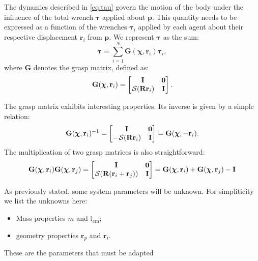 The dynamics described in \eqref{eq:tau} govern the motion of the body under the influence of the total wrench $\boldsymbol{\tau}$ applied about $\mathbf{p}$. This quantity needs to be expressed as a function of the wrenches $\boldsymbol{\tau}_i$ applied by each agent about their respective displacement $\mathbf{r}_i$ from $\mathbf{p}$. We represent $\boldsymbol{\tau}$ as the sum:
\begin{equation}
    \boldsymbol{\tau} = \sum_{i=1}^N\mathbf{G}(\boldsymbol{\chi}, \mathbf{r}_i)\boldsymbol{\tau}_i, \label{eq:tauNtauIrelation}
\end{equation}
where $\mathbf{G}$ denotes the grasp matrix, defined as:
\begin{equation}
    \mathbf{G}(\boldsymbol{\chi}, \mathbf{r}_i) = \begin{bmatrix}
        \mathbf{I} & \mathbf{0} \\
        \SL[\mathbf{R}\mathbf{r}_i] & \mathbf{I}
    \end{bmatrix}. \label{eq:graspmatrix}
\end{equation}

The grasp matrix exhibits interesting properties. Its inverse is given by a simple relation:
\begin{align}
    \mathbf{G}(\boldsymbol{\chi}, \mathbf{r}_i)^{-1} = \begin{bmatrix}
        \mathbf{I} & \mathbf{0} \\
        -\SL[\mathbf{R}\mathbf{r}_i] & \mathbf{I}
    \end{bmatrix} = \mathbf{G}(\boldsymbol{\chi}, -\mathbf{r}_i).
\end{align}
The multiplication of two grasp matrices is also straightforward:
\begin{align}
    \mathbf{G}(\boldsymbol{\chi}, \mathbf{r}_i)\mathbf{G}(\boldsymbol{\chi}, \mathbf{r}_j) =
    \begin{bmatrix}
        \mathbf{I} & \mathbf{0} \\
        \SL[\mathbf{R}(\mathbf{r}_i + \mathbf{r}_j)] & \mathbf{I}
    \end{bmatrix} = \mathbf{G}(\boldsymbol{\chi}, \mathbf{r}_i) + \mathbf{G}(\boldsymbol{\chi}, \mathbf{r}_j) - \mathbf{I}
\end{align}

As previously stated, some system parameters will be unknown. For simpliticity we list the unknowns here:
\begin{itemize}
    \item Mass properties $m$ and $\mathbb{I}_\text{cm}$;
    \item geometry properties $\mathbf{r}_p$ and $\mathbf{r}_i$.
\end{itemize}
These are the parameters that must be adapted

